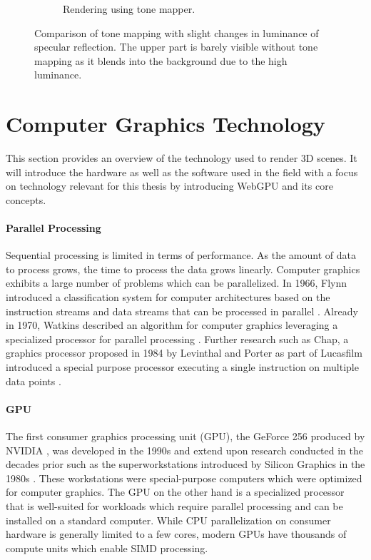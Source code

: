 \begin{figure}[H]
\begin{subfigure}[t]{0.3\textwidth}
    \caption{Rendering using tone mapper.}
    \label{fig:tone-mapping-applied}
  \end{subfigure}
  \hspace*{2cm}
  \caption{Comparison of tone mapping with slight changes in luminance of specular reflection. The upper part is barely visible without tone mapping as it blends into the background due to the high luminance.}
  \label{fig:tone-mapping}
\end{figure}

\section{Computer Graphics Technology}

This section provides an overview of the technology used to render 3D scenes. It will introduce the hardware as well as the software used in the field with a focus on technology relevant for this thesis by introducing \gls{WebGPU} and its core concepts.

\paragraph{Parallel Processing}

Sequential processing is limited in terms of performance. As the amount of data to process grows, the time to process the data grows linearly. Computer graphics exhibits a large number of problems which can be parallelized. In 1966, Flynn introduced a classification system for computer architectures based on the instruction streams and data streams that can be processed in parallel \cite{flynnTaxonomy,flynnTaxonomy2}. Already in 1970, Watkins described an algorithm for computer graphics leveraging a specialized processor for parallel processing \cite{surfaceAlgorithmProcessor}. Further research such as Chap, a  graphics processor proposed in 1984 by Levinthal and Porter as part of Lucasfilm introduced a special purpose processor executing a single instruction on multiple data points \cite{chapSIMDgpu}.

\paragraph{GPU}

The first consumer graphics processing unit (\gls{GPU}), the GeForce 256 produced by NVIDIA \cite{evolutionOfGPU}, was developed in the 1990s and extend upon research conducted in the decades prior such as the superworkstations introduced by Silicon Graphics in the 1980s \cite{sigWorkstation}. These workstations were special-purpose computers which were optimized for computer graphics. The \gls{GPU} on the other hand is a specialized processor that is well-suited for workloads which require parallel processing and can be installed on a standard computer. While \gls{CPU} parallelization on consumer hardware is generally limited to a few cores, modern \glspl{GPU} have thousands of compute units which enable \gls{SIMD} processing.

